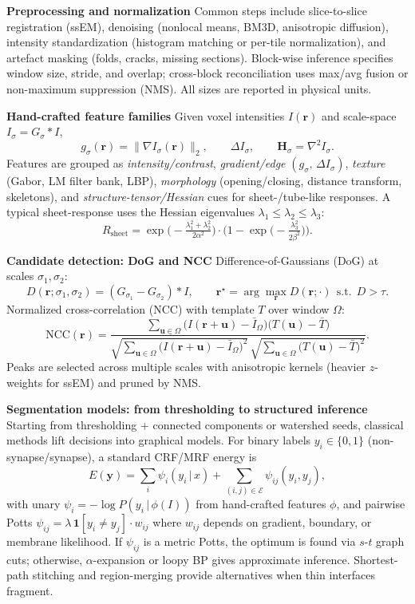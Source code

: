 \medskip
\noindent\textbf{Preprocessing and normalization}\;
Common steps include slice-to-slice registration (ssEM), denoising (nonlocal means, BM3D, anisotropic diffusion), intensity standardization (histogram matching or per-tile normalization), and artefact masking (folds, cracks, missing sections).
Block-wise inference specifies window size, stride, and overlap; cross-block reconciliation uses max/avg fusion or non-maximum suppression (NMS).
All sizes are reported in physical units.

\medskip
\noindent\textbf{Hand-crafted feature families}\;
Given voxel intensities \(I(\mathbf r)\) and scale-space \(I_\sigma = G_\sigma * I\),
\[
g_\sigma(\mathbf r)=\lVert \nabla I_\sigma(\mathbf r)\rVert_2,\qquad
\Delta I_\sigma,\qquad
\mathbf H_\sigma=\nabla^2 I_\sigma.
\]
Features are grouped as \emph{intensity/contrast}, \emph{gradient/edge} \((g_\sigma,\,\Delta I_\sigma)\), \emph{texture} (Gabor, LM filter bank, LBP), \emph{morphology} (opening/closing, distance transform, skeletons), and \emph{structure-tensor/Hessian} cues for sheet-/tube-like responses.
A typical sheet-response uses the Hessian eigenvalues \(\lambda_1\le\lambda_2\le\lambda_3\):
\[
R_{\text{sheet}}
=\exp\!\Big(-\tfrac{\lambda_1^2+\lambda_2^2}{2\alpha^2}\Big)\cdot
\Big(1-\exp\!\big(-\tfrac{\lambda_3^2}{2\beta^2}\big)\Big).
\]

\medskip
\noindent\textbf{Candidate detection: DoG and NCC}\;
Difference-of-Gaussians (DoG) at scales \(\sigma_1,\sigma_2\):
\[
D(\mathbf r;\sigma_1,\sigma_2)=(G_{\sigma_1}-G_{\sigma_2})*I,\qquad
\mathbf r^\star=\arg\max_{\mathbf r} D(\mathbf r;\cdot)\ \ \text{s.t.}\ \ D>\tau.
\]
Normalized cross-correlation (NCC) with template \(T\) over window \(\Omega\):
\[
\mathrm{NCC}(\mathbf r)=
\frac{\sum_{\mathbf u\in\Omega}\!\big(I(\mathbf r+\mathbf u)-\bar I_\Omega\big)\big(T(\mathbf u)-\bar T\big)}
{\sqrt{\sum_{\mathbf u\in\Omega}\!\big(I(\mathbf r+\mathbf u)-\bar I_\Omega\big)^2}\,
 \sqrt{\sum_{\mathbf u\in\Omega}\!\big(T(\mathbf u)-\bar T\big)^2}}.
\]
Peaks are selected across multiple scales with anisotropic kernels (heavier \(z\)-weights for ssEM) and pruned by NMS.

\medskip
\noindent\textbf{Segmentation models: from thresholding to structured inference}\;
Starting from thresholding \(+\) connected components or watershed seeds, classical methods lift decisions into graphical models.
For binary labels \(y_i\in\{0,1\}\) (non-synapse/synapse), a standard CRF/MRF energy is
\[
E(\mathbf y)=\sum_i \psi_i(y_i\,|\,x)+\sum_{(i,j)\in\mathcal E}\psi_{ij}(y_i,y_j),
\]
with unary \(\psi_i=-\log P(y_i\,|\,\phi(I))\) from hand-crafted features \(\phi\),
and pairwise Potts \(\psi_{ij}=\lambda\,\mathbf 1[y_i\neq y_j]\cdot w_{ij}\) where \(w_{ij}\) depends on gradient, boundary, or membrane likelihood.
If \(\psi_{ij}\) is a metric Potts, the optimum is found via \(s\)-\(t\) graph cuts; otherwise, \(\alpha\)-expansion or loopy BP gives approximate inference.
Shortest-path stitching and region-merging provide alternatives when thin interfaces fragment.

